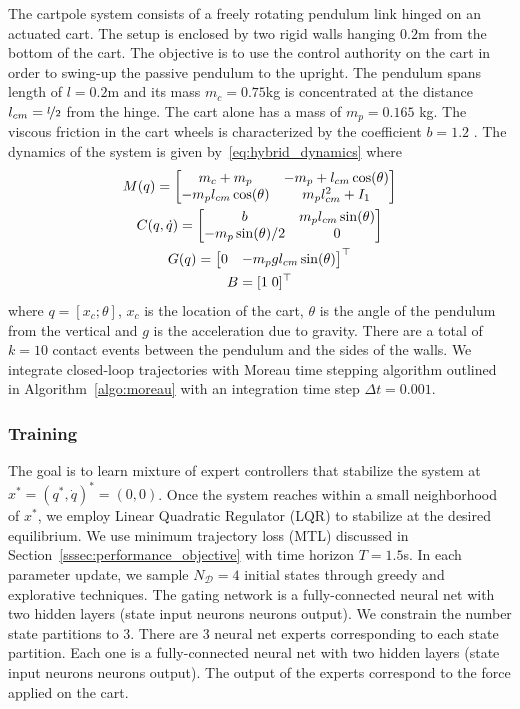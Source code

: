 The cartpole system consists of a freely rotating pendulum link hinged on an
actuated cart.
%
The setup is enclosed by two rigid walls hanging $0.2$m from the bottom of the
cart.
%
The objective is to use the control authority on the cart in order to swing-up
the passive pendulum to the upright.
%
The pendulum spans length of $l=0.2$m and its mass $m_c = 0.75$kg is
concentrated at the distance $l_{cm}=\nicefrac{l}{2}$ from the hinge.
%
The cart alone has a mass of $m_p=0.165$ kg. The viscous friction in the cart
wheels is characterized by the coefficient $b=1.2$ .
%
The dynamics of the system
is given by~\eqref{eq:hybrid_dynamics} where 
\begin{equation}
    \begin{gathered}
        M(q) = \begin{bmatrix}m_c + m_p & -m_p+l_{cm} \cos(\theta) \\
        -m_pl_{cm}\cos(\theta) & m_p l_{cm}^2+I_1\end{bmatrix} \\
        C(q, \dot{q}) = \begin{bmatrix}b  & m_pl_{cm}\sin(\theta) \\
                -m_p\sin(\theta)/2 & 0\end{bmatrix} \\
        G(q) = \begin{bmatrix}0 & -m_pg l_{cm} \sin(\theta)\end{bmatrix}^\top \\
        B = [1 \; 0]^\top
    \end{gathered}
\end{equation}
\noindent where $q = [x_c; \theta]$, $x_c$ is the location of the cart, $\theta$
is the angle of the pendulum from the vertical and $g$ is the acceleration due
to gravity. 
%
There are a total of $k=10$ contact events between the pendulum and the sides of
the walls.
%
We integrate closed-loop trajectories with Moreau time stepping algorithm
outlined in Algorithm~\eqref{algo:moreau} with an integration time step $\Delta
t=0.001$.
%

\subsubsection{Training}
\label{sssec:cartpole_training}

The goal is to learn mixture of expert controllers that stabilize the system at
$x^* = (q^*, \dot{q})^* = (0, 0)$.
%
Once the system reaches within a small neighborhood of $x^*$, we employ Linear
Quadratic Regulator (LQR) to stabilize at the desired equilibrium.
%
We use minimum trajectory loss (MTL) discussed in
Section~\ref{sssec:performance_objective} with time horizon $T=1.5$s.
%
In each parameter update, we sample $N_{\mathcal{D}}=4$ initial states through
greedy and explorative techniques.
%
The gating network is a fully-connected neural net with two hidden layers (state input
 neurons  neurons  output).
% 
We constrain the number state partitions to 3.
%
There are 3 neural net experts corresponding to each state partition.
%
Each one is a fully-connected neural net with two hidden layers (state input
 neurons  neurons  output).
%
The output of the experts correspond to the force applied on the cart.


